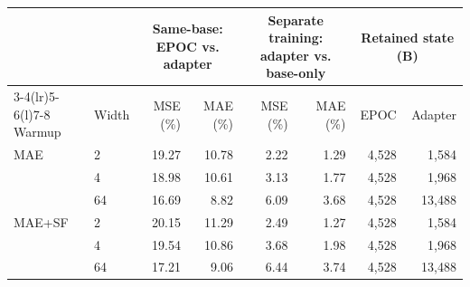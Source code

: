 \begingroup\fontsize{9}{11}\selectfont
\setlength{\tabcolsep}{4pt}
\renewcommand{\arraystretch}{1.15}
\begin{tabular}{@{}llrrrrrr@{}}
\toprule
& & \multicolumn{2}{c}{Same-base: EPOC vs. adapter} & \multicolumn{2}{c}{Separate training: adapter vs. base-only} & \multicolumn{2}{c}{Retained state (B)} \\
\cmidrule(lr){3-4}\cmidrule(lr){5-6}\cmidrule(l){7-8}
Warmup & Width & MSE (\%) & MAE (\%) & MSE (\%) & MAE (\%) & EPOC & Adapter \\
\midrule
MAE & 2 & 19.27 & 10.78 & 2.22 & 1.29 & 4,528 & 1,584 \\
& 4 & 18.98 & 10.61 & 3.13 & 1.77 & 4,528 & 1,968 \\
& 64 & 16.69 & 8.82 & 6.09 & 3.68 & 4,528 & 13,488 \\
\midrule
MAE+SF & 2 & 20.15 & 11.29 & 2.49 & 1.27 & 4,528 & 1,584 \\
& 4 & 19.54 & 10.86 & 3.68 & 1.98 & 4,528 & 1,968 \\
& 64 & 17.21 & 9.06 & 6.44 & 3.74 & 4,528 & 13,488 \\
\bottomrule
\end{tabular}
\endgroup
